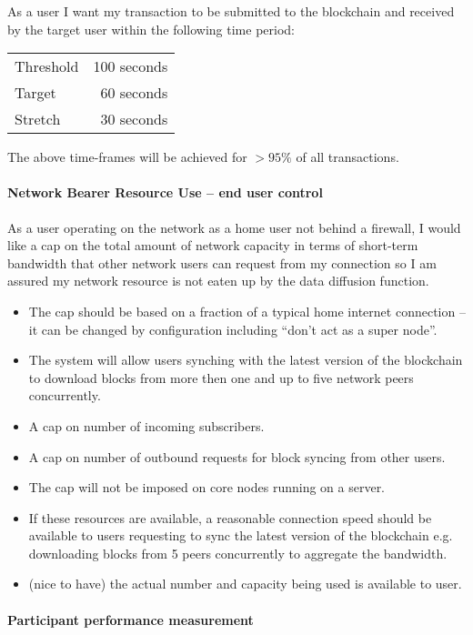\documentclass{report}
\theoremstyle{definition}{
  \newtheorem{lemma}{Lemma}[section] %
  \newtheorem{definition}[lemma]{Definition}
}
\theoremstyle{theorem}{
  \newtheorem{invariant}[lemma]{Invariant}
  \newtheorem{proofobligation}[lemma]{Proof Obligation}
}
\numberwithin{equation}{lemma}
\begin{document}
As a user I want my transaction to be submitted to the blockchain and received
by the target user within the following time period:
%
\begin{center}
\begin{tabular}{lr}
Threshold & 100 seconds \\
Target    & 60 seconds  \\
Stretch   & 30 seconds  \\
\end{tabular}
\end{center}
%
The above time-frames will be achieved for $>95\%$ of all transactions.

\paragraph{Network Bearer Resource Use -- end user control}

As a user operating on the network as a home user not behind a firewall, I
would like a cap on the total amount of network capacity in terms of short-term
bandwidth that other network users can request from my connection so I am
assured my network resource is not eaten up by the data diffusion function.

\begin{itemize}
\item The cap should be based on a fraction of a typical home internet
      connection -- it can be changed by configuration including ``don't act
      as a super node''.
\item The system will allow users synching with the latest version of the
      blockchain to download blocks from more then one and up to five network
      peers concurrently.
\item A cap on number of incoming subscribers.
\item A cap on number of outbound requests for block syncing from other users.
\item The cap will not be imposed on core nodes running on a server.
\item If these resources are available, a reasonable connection speed should be
      available to users requesting to sync the latest version of the
      blockchain e.g. downloading blocks from 5 peers concurrently to aggregate
      the bandwidth.
\item (nice to have) the actual number and capacity being used is available to
      user.
\end{itemize}

\paragraph{Participant performance measurement}
\end{document}
